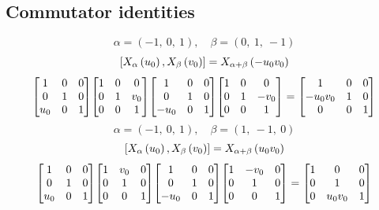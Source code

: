\documentclass[11pt]{article}
\theoremstyle{definition}
\begin{document}
\def\arraystretch{1}

\subsection{Commutator identities}

\providecommand{\scaletoalign}[2]{%
  \sbox0{$#2$}%
  \ifdim\wd0>#1\relax 
    \resizebox{#1}{!}{\usebox0}%
  \else 
    \usebox0%
  \fi 
}
\[
\alpha = \left( -1, \  0, \  1\right), \quad \beta = \left( 0, \  1, \  -1\right)
\]
\[
\scaletoalign{\textwidth}{\left[ X_{\alpha}\left(u_{0}\right), X_{\beta}\left(v_{0}\right) \right] = X_{\alpha + \beta}\left(- u_{0} v_{0}\right)}
\]
\[
\scaletoalign{\textwidth}{{\left[\begin{matrix}1 & 0 & 0\\0 & 1 & 0\\u_{0} & 0 & 1\end{matrix}\right]} {\left[\begin{matrix}1 & 0 & 0\\0 & 1 & v_{0}\\0 & 0 & 1\end{matrix}\right]} {\left[\begin{matrix}1 & 0 & 0\\0 & 1 & 0\\- u_{0} & 0 & 1\end{matrix}\right]} {\left[\begin{matrix}1 & 0 & 0\\0 & 1 & - v_{0}\\0 & 0 & 1\end{matrix}\right]} = {\left[\begin{matrix}1 & 0 & 0\\- u_{0} v_{0} & 1 & 0\\0 & 0 & 1\end{matrix}\right]}}
\]
\[
\alpha = \left( -1, \  0, \  1\right), \quad \beta = \left( 1, \  -1, \  0\right)
\]
\[
\scaletoalign{\textwidth}{\left[ X_{\alpha}\left(u_{0}\right), X_{\beta}\left(v_{0}\right) \right] = X_{\alpha + \beta}\left(u_{0} v_{0}\right)}
\]
\[
\scaletoalign{\textwidth}{{\left[\begin{matrix}1 & 0 & 0\\0 & 1 & 0\\u_{0} & 0 & 1\end{matrix}\right]} {\left[\begin{matrix}1 & v_{0} & 0\\0 & 1 & 0\\0 & 0 & 1\end{matrix}\right]} {\left[\begin{matrix}1 & 0 & 0\\0 & 1 & 0\\- u_{0} & 0 & 1\end{matrix}\right]} {\left[\begin{matrix}1 & - v_{0} & 0\\0 & 1 & 0\\0 & 0 & 1\end{matrix}\right]} = {\left[\begin{matrix}1 & 0 & 0\\0 & 1 & 0\\0 & u_{0} v_{0} & 1\end{matrix}\right]}}
\]
\end{document}
